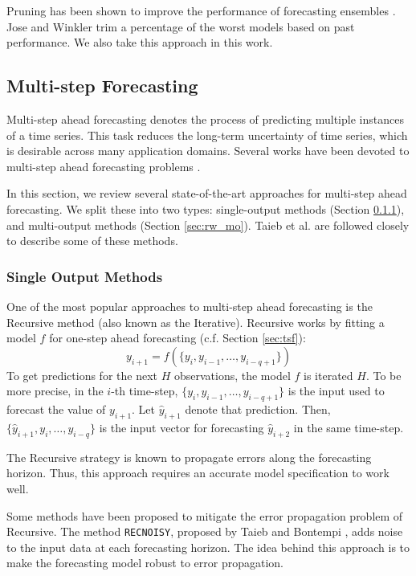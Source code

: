 \documentclass[smallcondensed]{svjour3}
\begin{document}
Pruning has been shown to improve the performance of forecasting ensembles \cite{jose2008simple,cerqueira2019arbitrage}. Jose and Winkler \cite{jose2008simple} trim a percentage of the worst models based on past performance. We also take this approach in this work.

\subsection{Multi-step Forecasting}\label{sec:rw3}

Multi-step ahead forecasting denotes the process of predicting multiple instances of a time series. This task reduces the long-term uncertainty of time series, which is desirable across many application domains. Several works have been devoted to multi-step ahead forecasting problems \cite{taieb2012review,venkatraman2015improving,de2019batch}.

In this section, we review several state-of-the-art approaches for multi-step ahead forecasting. We split these into two types: single-output methods (Section \ref{sec:rw_so}), and multi-output methods (Section \ref{sec:rw_mo}). Taieb et al. \cite{taieb2012review} are followed closely to describe some of these methods. 

\subsubsection{Single Output Methods}\label{sec:rw_so}

One of the most popular approaches to multi-step ahead forecasting is the Recursive method (also known as the Iterative). 
Recursive works by fitting a model $f$ for one-step ahead forecasting (c.f. Section \ref{sec:tsf}): $$y_{i+1} = f(\{y_{i}, y_{i-1}, \dots, y_{i-q+1} \})$$ 
To get predictions for the next $H$ observations, the model $f$ is iterated $H$. To be more precise, in the $i$-th time-step, $\{y_{i}, y_{i-1}, \dots, y_{i-q+1} \}$ is the input used to forecast the value of $y_{i+1}$. Let $\hat{y}_{i+1}$ denote that prediction. Then, $\{\hat{y}_{i+1}, y_{i}, \dots, y_{i-q} \}$ is the input vector for forecasting $\hat{y}_{i+2}$ in the same time-step.

The Recursive strategy is known to propagate errors along the forecasting horizon. Thus, this approach requires an accurate model specification to work well.

Some methods have been proposed to mitigate the error propagation problem of Recursive. 
The method \texttt{RECNOISY}, proposed by Taieb and Bontempi \cite{taieb2011recursive}, adds noise to the input data at each forecasting horizon. The idea behind this approach is to make the forecasting model robust to error propagation. 
\end{document}
